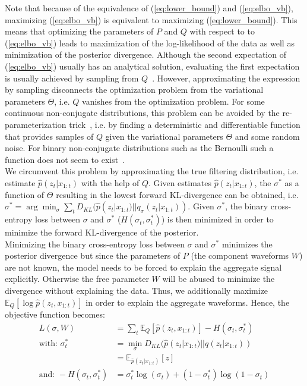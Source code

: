 Note that because of the equivalence of (\ref{eq:lower_bound}) and (\ref{eq:elbo_vb}), maximizing (\ref{eq:elbo_vb}) is equivalent to maximizing (\ref{eq:lower_bound}). This means that optimizing the parameters of $P$ and $Q$ with respect to to (\ref{eq:elbo_vb}) leads to maximization of the log-likelihood of the data as well as minimization of the posterior divergence. Although the second expectation of (\ref{eq:elbo_vb}) usually has an analytical solution, evaluating the first expectation is usually achieved by sampling from $Q$~\cite{ranganath2014black}. However, approximating the expression by sampling disconnects the optimization problem from the variational parameters $\Theta$, i.e. $Q$ vanishes from the optimization problem. For some continuous non-conjugate distributions, this problem can be avoided by the re-parameterization trick~\cite{ruiz2016generalized}, i.e. by finding a deterministic and differentiable function that provides samples of $Q$ given the variational parameters $\Theta$ and some random noise. For binary non-conjugate distributions such as the Bernoulli such a function does not seem to exist~\cite{kingma2013auto}.\\
We circumvent this problem by approximating the true filtering distribution, i.e. estimate $\hat{p}(z_{t}|x_{1:t})$ with the help of $Q$. Given estimates $\hat{p}(z_{t}|x_{1:t})$, the $\sigma^*$ as a function of $\Theta$ resulting in the lowest forward KL-divergence can be obtained, i.e. $\sigma^* = \arg \min_{\sigma}\sum_t D_{KL}(\hat{p}(z_{t}|x_{1:t}) || q_\sigma(z_{t}|x_{1:t}))$. Given $\sigma^*$, the binary cross-entropy loss between $\sigma$ and $\sigma^*$ ($H(\sigma_t, \sigma_t^*)$) is then minimized in order to minimize the forward KL-divergence of the posterior.\\
Minimizing the binary cross-entropy loss between $\sigma$ and $\sigma^*$ minimizes the posterior divergence but since the parameters of $P$ (the component waveforms $W$) are not known, the model needs to be forced to explain the aggregate signal explicitly. Otherwise the free parameter $W$ will be abused to minimize the divergence without explaining the data. Thus, we additionally maximize $\mathbb{E}_{Q}[\log \hat{p}(z_t, x_{1:t})]$ in order to explain the aggregate waveforms. Hence, the objective function becomes:
\begin{align*}
L(\sigma, W) &=  \sum_t\mathbb{E}_Q[\hat{p}(z_t, x_{1:t})] - H(\sigma_t, \sigma_t^*)\\
\text{with:\ \ } \sigma_t^* &= \min_{\sigma}D_{KL}(\hat{p}(z_{t}|x_{1:t}) || q(z_{t}|x_{1:t})) \\
 &= \mathbb{E}_{\hat{p}(z_{t}|x_{1:t})}[z] \\
\text{and:\ \ } -H(\sigma_t, \sigma_t^*) &= \sigma_t^*\log(\sigma_t) + (1-\sigma_t^*)\log(1-\sigma_t) \\
\end{align*}
